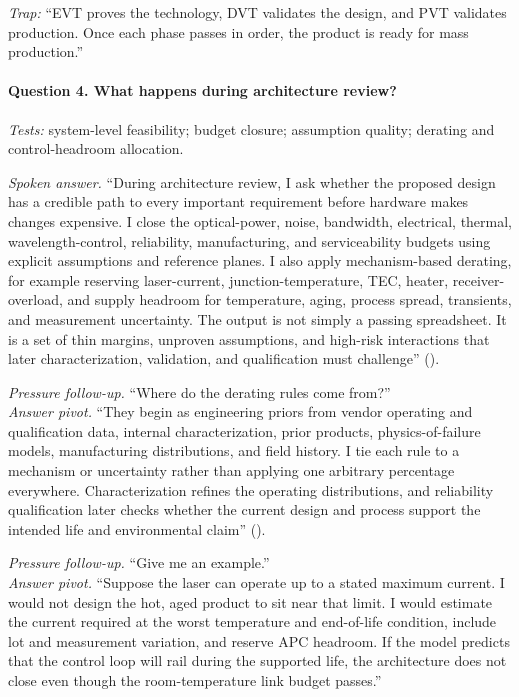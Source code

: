 \textit{Trap:} ``EVT proves the technology, DVT validates the design, and PVT
validates production. Once each phase passes in order, the product is ready for
mass production.''

\paragraph{Question 4. What happens during architecture review?}
\textit{Tests:} system-level feasibility; budget closure; assumption quality;
derating and control-headroom allocation.

\textit{Spoken answer.}
``During architecture review, I ask whether the proposed design has a credible
path to every important requirement before hardware makes changes expensive. I
close the optical-power, noise, bandwidth, electrical, thermal,
wavelength-control, reliability, manufacturing, and serviceability budgets
using explicit assumptions and reference planes. I also apply mechanism-based
derating, for example reserving laser-current, junction-temperature, TEC,
heater, receiver-overload, and supply headroom for temperature, aging, process
spread, transients, and measurement uncertainty. The output is not simply a
passing spreadsheet. It is a set of thin margins, unproven assumptions, and
high-risk interactions that later characterization, validation, and
qualification must challenge''
().

\textit{Pressure follow-up.} ``Where do the derating rules come from?''\\
\textit{Answer pivot.} ``They begin as engineering priors from vendor operating
and qualification data, internal characterization, prior products,
physics-of-failure models, manufacturing distributions, and field history. I
tie each rule to a mechanism or uncertainty rather than applying one arbitrary
percentage everywhere. Characterization refines the operating distributions,
and reliability qualification later checks whether the current design and
process support the intended life and environmental claim''
().

\textit{Pressure follow-up.} ``Give me an example.''\\
\textit{Answer pivot.} ``Suppose the laser can operate up to a stated maximum
current. I would not design the hot, aged product to sit near that limit. I
would estimate the current required at the worst temperature and end-of-life
condition, include lot and measurement variation, and reserve APC headroom. If
the model predicts that the control loop will rail during the supported life,
the architecture does not close even though the room-temperature link budget
passes.''

